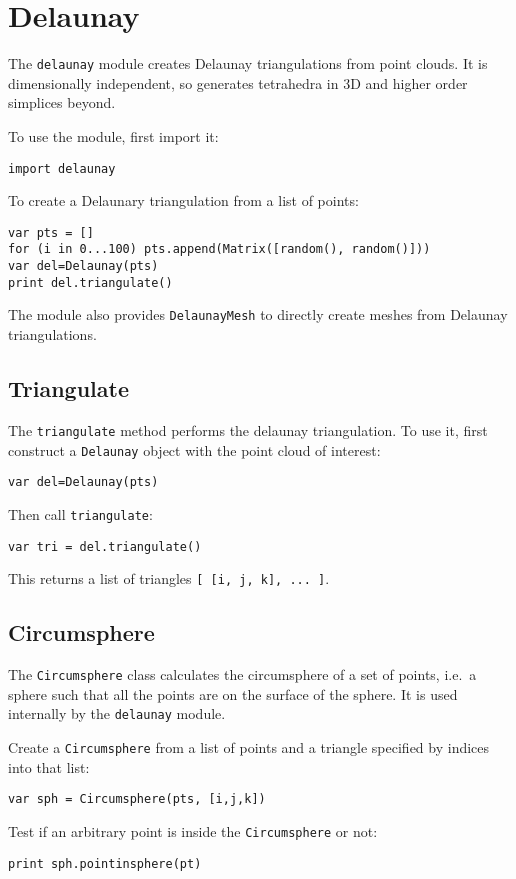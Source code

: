 \hypertarget{delaunay}{%
\section{Delaunay}\label{delaunay}}

The \texttt{delaunay} module creates Delaunay triangulations from point
clouds. It is dimensionally independent, so generates tetrahedra in 3D
and higher order simplices beyond.

To use the module, first import it:

\begin{lstlisting}
import delaunay
\end{lstlisting}

To create a Delaunary triangulation from a list of points:

\begin{lstlisting}
var pts = []
for (i in 0...100) pts.append(Matrix([random(), random()]))
var del=Delaunay(pts)
print del.triangulate()
\end{lstlisting}

The module also provides \texttt{DelaunayMesh} to directly create meshes
from Delaunay triangulations.

\hypertarget{triangulate}{%
\subsection{Triangulate}\label{triangulate}}

The \texttt{triangulate} method performs the delaunay triangulation. To
use it, first construct a \texttt{Delaunay} object with the point cloud
of interest:

\begin{lstlisting}
var del=Delaunay(pts)
\end{lstlisting}

Then call \texttt{triangulate}:

\begin{lstlisting}
var tri = del.triangulate()
\end{lstlisting}

This returns a list of triangles
\texttt{{[}\ {[}i,\ j,\ k{]},\ ...\ {]}}.

\hypertarget{circumsphere}{%
\subsection{Circumsphere}\label{circumsphere}}

The \texttt{Circumsphere} class calculates the circumsphere of a set of
points, i.e.~a sphere such that all the points are on the surface of the
sphere. It is used internally by the \texttt{delaunay} module.

Create a \texttt{Circumsphere} from a list of points and a triangle
specified by indices into that list:

\begin{lstlisting}
var sph = Circumsphere(pts, [i,j,k]) 
\end{lstlisting}

Test if an arbitrary point is inside the \texttt{Circumsphere} or not:

\begin{lstlisting}
print sph.pointinsphere(pt)
\end{lstlisting}
